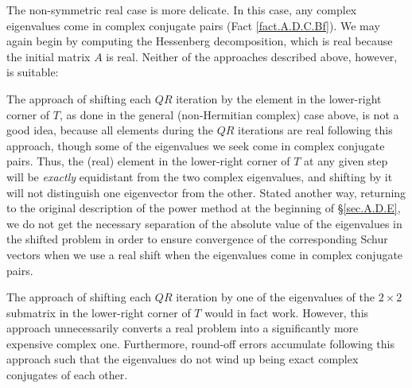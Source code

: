 \begin{figure*}[t]
\end{figure*}


\noindent The non-symmetric real case is more delicate.  In this case, any complex eigenvalues come in complex conjugate pairs (Fact \ref{fact.A.D.C.Bf}).
We may again begin by computing the Hessenberg decomposition, which is real because the initial matrix $A$ is real.  Neither of the approaches described above, however, is suitable:
\beginmylistb
\item The approach of shifting each $QR$ iteration by the element in the lower-right corner of $T$, as done in the general (non-Hermitian complex) case above, is
not a good idea, because all elements during the $QR$ iterations are real following this approach, though some of the eigenvalues we seek come in complex conjugate pairs.
Thus, the (real) element in the lower-right corner of $T$ at any given step
will be {\it exactly} equidistant from the two complex eigenvalues, and shifting by it will not distinguish one eigenvector from the other.  Stated another way,
returning to the original description of the power method at the beginning of \S \ref{sec.A.D.E}, we do not get the necessary separation of the absolute value of the eigenvalues in the shifted problem
in order to ensure convergence of the corresponding Schur vectors when we use a real shift when the eigenvalues come in complex conjugate pairs. 
\item The approach of shifting each $QR$ iteration by one of the eigenvalues of the $2\times 2$ submatrix in the
lower-right corner of $T$ would in fact work.  However, this approach unnecessarily converts a real problem into a significantly more expensive complex one.  Furthermore, round-off errors accumulate following this approach
such that the eigenvalues do not wind up being exact complex conjugates of each other.
\endmylist

